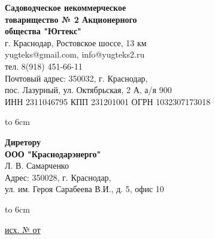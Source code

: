 \noindent\parbox[l][71mm]{80mm}
{
	 \begin{center}
 {\small \textbf{Садоводческое некоммерческое\\ товарищество
 	№  2 Акционерного\\ общества "Югтекс"\\
 }}
 \footnotesize{г. Краснодар, Ростовское шоссе, 13 км\\
 	yugteks@gmail.com, info@yugteks2.ru\\
 	тел. 8(918) 451-66-11\\
 	Почтовый адрес: 350032, г. Краснодар,\\ пос. Лазурный, ул. Октябрьская, 2 А, а/я   900
  }\\
 {ИНН 2311046795 КПП 231201001 ОГРН 1032307173018}
		\end{center}
\hbox to 6cm{ }}\hfill
\parbox[l][71mm]{65mm}
{ \begin{center}
	\small{
	\textbf{Диретору\\ ООО "Краснодарэнерго"}\\
	\vspace{3mm}
	Л. В. Самарченко\\
	\vspace{3mm}
 {\footnotesize Адрес: 350028, г. Краснодар,\\ ул. им. Героя Сарабеева В.И., д. 5, офис 10}

	}
\end{center}
\hbox to 6cm{ }}
\linebreak
\vspace{-12mm}

\underline{исх. №   от  } 